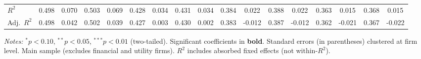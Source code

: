 \begin{landscape}
\begin{table}[H]
\begin{tabular}{lcccccccccccccccc}
$R^2$ & 0.498 & 0.070 & 0.503 & 0.069 & 0.428 & 0.034 & 0.431 & 0.034 & 0.384 & 0.022 & 0.388 & 0.022 & 0.363 & 0.015 & 0.368 & 0.015 \\
Adj.~$R^2$ & 0.498 & 0.042 & 0.502 & 0.039 & 0.427 & 0.003 & 0.430 & 0.002 & 0.383 & -0.012 & 0.387 & -0.012 & 0.362 & -0.021 & 0.367 & -0.022 \\
\bottomrule
\end{tabular}
\begin{minipage}{\linewidth}
\vspace{2pt}\scriptsize
\textit{Notes:} $^{*}p<0.10$, $^{**}p<0.05$, $^{***}p<0.01$ (two-tailed).
 Significant coefficients in \textbf{bold}.
 Standard errors (in parentheses) clustered at firm level.
 Main sample (excludes financial and utility firms).
 $R^2$ includes absorbed fixed effects (not within-$R^2$).
\end{minipage}
\end{table}
\end{landscape}